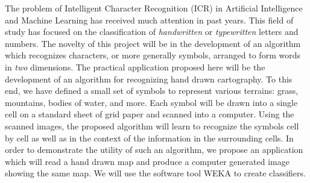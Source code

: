 
The problem of Intelligent Character Recognition (ICR) in Artificial
Intelligence and Machine Learning has received much attention in past years.
This field of study has focused on the classification of \emph{handwritten}  or
\emph{typewritten} letters and numbers.  The novelty of this project will be in
the development of an algorithm which recognizes characters, or more generally
symbols, arranged to form words in \emph{two} dimensions. The practical
application proposed here will be the development of an algorithm for
recognizing hand drawn cartography. To this end, we have defined a small set of
symbols to represent various terrains: grass, mountains, bodies of water, and
more. Each symbol will be drawn into a single cell on a standard sheet of grid
paper and scanned into a computer. Using the scanned images, the proposed
algorithm will learn to recognize the symbols cell by cell as well as in the
context of the information in the surrounding cells. In order to demonstrate
the utility of such an algorithm, we propose an application which will read a
hand drawn map and produce a computer generated image showing the same map. We
will use the software tool WEKA\cite{hall2009} to create classifiers.

